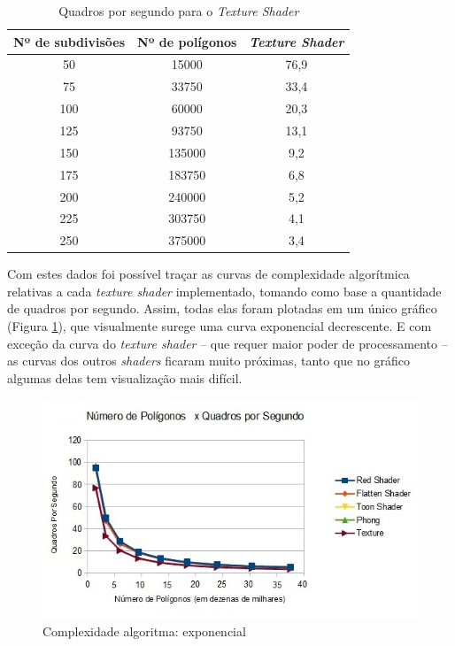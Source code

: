\begin{table}[h]
	\centering
	\begin{tabular}{ccc}
		\toprule
		\textbf{Nº de subdivisões} & \textbf{Nº de polígonos} & 
		\textbf{\textit{Texture Shader}}  \\
		\midrule
		50 & 15000 & 76,9  \\
		75 & 33750 & 33,4  \\
		100 & 60000 &  20,3\\
		125 & 93750 & 13,1\\
		150 & 135000 &  9,2\\
		175 & 183750 &  6,8\\
		200 & 240000 &  5,2\\
		225 & 303750 &  4,1\\
		250 & 375000 &  3,4\\
		\bottomrule
	\end{tabular}
	\caption{Quadros por segundo para o \textit{Texture Shader}}
	\label{tab03}
\end{table}

	Com estes dados foi possível traçar as curvas de complexidade algorítmica relativas a cada \textit{texture shader} implementado, tomando como base a quantidade de quadros por segundo. Assim, todas elas foram plotadas em um único gráfico (Figura \ref{complexidade}), que visualmente surege uma curva exponencial decrescente. E com exceção da curva do \textit{texture shader} -- que requer maior poder de processamento -- as curvas dos outros \textit{shaders} ficaram muito próximas, tanto que no gráfico algumas delas tem visualização mais difícil. 

	 \begin{figure}[h]
	\centering
		\includegraphics[keepaspectratio=true,scale=0.9]{figuras/complexidade_exp.jpg}
	\caption{Complexidade algoritma: exponencial}
	\label{complexidade}
	\end{figure}

